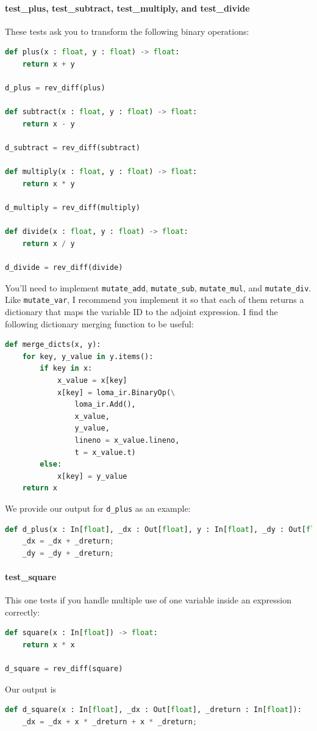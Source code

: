 \paragraph{test_plus, test_subtract, test_multiply, and test_divide} These tests ask you to transform the following binary operations:
\begin{lstlisting}[language=Python]
def plus(x : float, y : float) -> float:
    return x + y

d_plus = rev_diff(plus)

def subtract(x : float, y : float) -> float:
    return x - y

d_subtract = rev_diff(subtract)

def multiply(x : float, y : float) -> float:
    return x * y

d_multiply = rev_diff(multiply)

def divide(x : float, y : float) -> float:
    return x / y

d_divide = rev_diff(divide)
\end{lstlisting}

You'll need to implement \lstinline{mutate_add}, \lstinline{mutate_sub}, \lstinline{mutate_mul}, and \lstinline{mutate_div}. Like \lstinline{mutate_var}, I recommend you implement it so that each of them returns a dictionary that maps the variable ID to the adjoint expression. I find the following dictionary merging function to be useful:
\begin{lstlisting}[language=Python]
def merge_dicts(x, y):
    for key, y_value in y.items():
        if key in x:
            x_value = x[key]
            x[key] = loma_ir.BinaryOp(\
                loma_ir.Add(),
                x_value,
                y_value,
                lineno = x_value.lineno,
                t = x_value.t)
        else:
            x[key] = y_value
    return x
\end{lstlisting}

We provide our output for \lstinline{d_plus} as an example:
\begin{lstlisting}[language=Python]
def d_plus(x : In[float], _dx : Out[float], y : In[float], _dy : Out[float], _dreturn : In[float]):
	_dx = _dx + _dreturn;
	_dy = _dy + _dreturn;
\end{lstlisting}

\paragraph{test_square} This one tests if you handle multiple use of one variable inside an expression correctly:
\begin{lstlisting}[language=Python]
def square(x : In[float]) -> float:
    return x * x

d_square = rev_diff(square)
\end{lstlisting}
Our output is
\begin{lstlisting}[language=Python]
def d_square(x : In[float], _dx : Out[float], _dreturn : In[float]):
	_dx = _dx + x * _dreturn + x * _dreturn;
\end{lstlisting}


